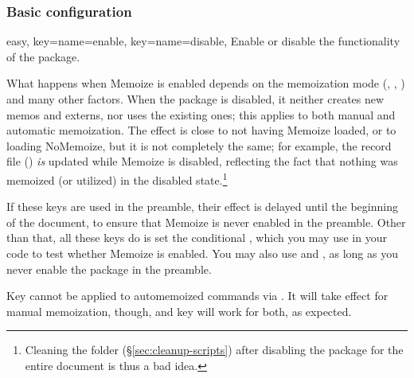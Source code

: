 \documentclass[a4paper,11pt]{article}
\begin{document}
\subsubsection{Basic configuration}
\label{sec:ref:memoization:basic}

\begin{doc}{easy,
    key={name=enable},
    key={name=disable},
  }
  Enable or disable the functionality of the package.

  What happens when Memoize is enabled depends on the memoization mode
  (, , ) and many other
  factors.  When the package is disabled, it neither creates new memos and
  externs, nor uses the existing ones; this applies to both manual and
  automatic memoization. The effect is close to not having Memoize loaded, or
  to loading NoMemoize, but it is not completely the same; for example, the
  record file (\dmmz) \emph{is} updated while Memoize is disabled, reflecting
  the fact that nothing was memoized (or utilized) in the disabled
  state.\footnote{Cleaning the folder (\S\ref{sec:cleanup-scripts}) after
    disabling the package for the entire document is thus a bad idea.}

  If these keys are used in the preamble, their effect is delayed until the
  beginning of the document, to ensure that Memoize is never enabled in the
  preamble.  Other than that, all these keys do is set the 
  conditional , which you may use in your code to test
  whether Memoize is enabled.  You may also use  and
  , as long as you never enable the package in the
  preamble.

  Key  cannot be applied to automemoized commands via
  .  It will take effect for manual memoization, though, and
  key  will work for both, as expected.
\end{doc}
\end{document}

